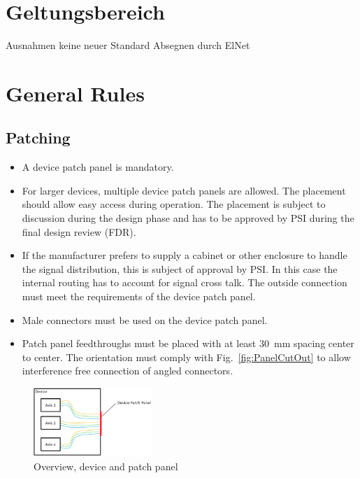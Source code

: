 \section{Geltungsbereich}
Ausnahmen keine neuer Standard
Absegnen durch ElNet
\section{General Rules}

\subsection{Patching}
\begin{itemize}
    \item A device patch panel is mandatory.
    \item For larger devices, multiple device patch panels are allowed.
    The placement should allow easy access during operation. 
    The placement is subject to discussion during the design phase and has to be approved by PSI during the final design review (FDR).
    \item If the manufacturer prefers to supply a cabinet or other enclosure to handle the signal distribution, this is subject of approval by PSI.
            In this case the internal routing has to account for signal cross talk.
            The outside connection must meet the requirements of the device patch panel. 
    \item Male connectors must be used on the device patch panel.
    \item Patch panel feedthroughs must be placed with at least 30~mm spacing center to center.
            The orientation must comply with Fig.~\ref{fig:PanelCutOut} to allow interference free connection of angled connectors.
\end{itemize}

\begin{figure}[H]
\centering
\includegraphics[width=0.4\textwidth]{Figures/DevicePatchPanel.jpg}
\caption{\label{fig:DevicePatchPanel}Overview, device and patch panel}
\end{figure}


